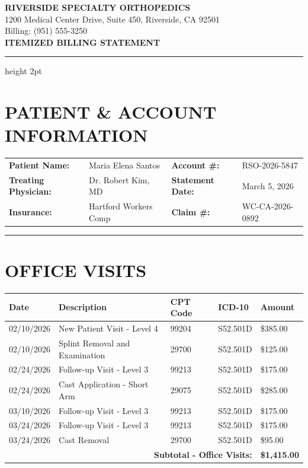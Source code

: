 \documentclass[11pt]{article}
\begin{document}
\begin{center}
{\Large\bfseries\color{medblue} RIVERSIDE SPECIALTY ORTHOPEDICS}\\[0.3em]
{\small 1200 Medical Center Drive, Suite 450, Riverside, CA 92501}\\
{\small Billing: (951) 555-3250}\\[1em]
{\LARGE\bfseries ITEMIZED BILLING STATEMENT}
\end{center}

\vspace{0.5em}
\hrule height 2pt
\vspace{1em}

\section*{PATIENT \& ACCOUNT INFORMATION}

\begin{tabular}{@{}p{4cm}p{5cm}p{3.5cm}p{4cm}@{}}
\textbf{Patient Name:} & Maria Elena Santos & \textbf{Account \#:} & RSO-2026-5847 \\
\textbf{Treating Physician:} & Dr. Robert Kim, MD & \textbf{Statement Date:} & March 5, 2026 \\
\textbf{Insurance:} & Hartford Workers Comp & \textbf{Claim \#:} & WC-CA-2026-0892 \\
\end{tabular}

\vspace{1em}
\hrule
\vspace{1em}

\section*{OFFICE VISITS}

\begin{longtable}{@{}p{2cm}p{6cm}p{2cm}p{2cm}p{2.5cm}@{}}
\toprule
\textbf{Date} & \textbf{Description} & \textbf{CPT Code} & \textbf{ICD-10} & \textbf{Amount} \\
\midrule
\endhead

02/10/2026 & New Patient Visit - Level 4 & 99204 & S52.501D & \$385.00 \\
02/10/2026 & Splint Removal and Examination & 29700 & S52.501D & \$125.00 \\
02/24/2026 & Follow-up Visit - Level 3 & 99213 & S52.501D & \$175.00 \\
02/24/2026 & Cast Application - Short Arm & 29075 & S52.501D & \$285.00 \\
03/10/2026 & Follow-up Visit - Level 3 & 99213 & S52.501D & \$175.00 \\
03/24/2026 & Follow-up Visit - Level 3 & 99213 & S52.501D & \$175.00 \\
03/24/2026 & Cast Removal & 29700 & S52.501D & \$95.00 \\
\midrule
\multicolumn{4}{r}{\textbf{Subtotal - Office Visits:}} & \textbf{\$1,415.00} \\
\bottomrule
\end{longtable}
\end{document}
